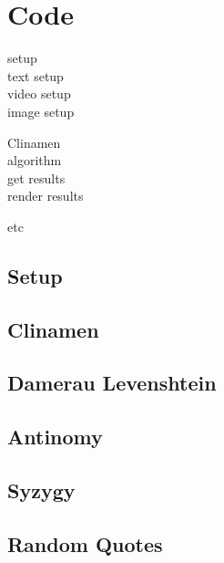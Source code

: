
\chapter{Code}
\label{app:code}

setup\\
 text setup\\
 video setup\\
 image setup

Clinamen\\
 algorithm\\
 get results\\
 render results

 etc

\section{Setup}



\section{Clinamen}



\section{Damerau Levenshtein}



\section{Antinomy}



\section{Syzygy}



\section{Random Quotes}

